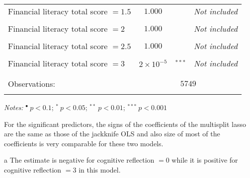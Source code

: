 \documentclass[a4paper,12pt]{article}
\begin{document}
{\begin{threeparttable}
\begin{small}
\begin{tabular}{lclrcl}
  \\
\vspace{-0.2cm}Financial literacy total score $=1.5$&$1.000$&&\multicolumn{3}{c}{\textit{Not included}}\\
  \\
\vspace{-0.2cm}Financial literacy total score $=2$&$1.000$& &\multicolumn{3}{c}{\textit{Not included}}\\
  \\
\vspace{-0.2cm}Financial literacy total score $=2.5$&$1.000$& &\multicolumn{3}{c}{\textit{Not included}}\\
  \\
  \vspace{-0.2cm}Financial literacy total score $=3$&$2\times10^{-5}$&$^{***}$&\multicolumn{3}{c}{\textit{Not included}}\\
  \\
\hline
\vspace{-0.4cm} \\ Observations:&  \multicolumn{5}{c}{$5749$} \\  \vspace{-0.4cm}
\\
\hline
\end{tabular} 
\end{small}
 \begin{tablenotes}
  \begin{footnotesize}
    \item \textit{Notes:} \hspace{0.15cm}$^{\bullet}~p<0.1$; $^{*}~p<0.05$; $^{**}~p<0.01$; $^{***}~p<0.001$
    \begin{adjustwidth}{1cm}{} \item For the significant predictors, the signs of the coefficients of the multisplit lasso are the same as those of the jackknife OLS and also size of most of the coefficients is very comparable for these two models.
    \item[a]The estimate is negative for cognitive reflection $=0$ while it is positive for cognitive reflection $=3$ in this model.
     \end{adjustwidth}
\singlespacing
  \end{footnotesize}
\end{tablenotes}
  \end{threeparttable} 
\par}
\linespread{1}

\pagebreak
\end{document}

